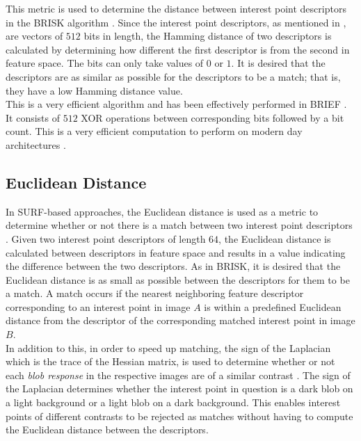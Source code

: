 This metric is used to determine the distance between interest point descriptors in the BRISK algorithm \citep{Leutenegger2011}. Since the interest point descriptors, as mentioned in , are vectors of $512$ bits in length, the Hamming distance of two descriptors is calculated by determining how different the first descriptor is from the second in feature space. The bits can only take values of $0$ or $1$. It is desired that the descriptors are as similar as possible for the descriptors to be a match; that is, they have a low Hamming distance value. \\

This is a very efficient algorithm and has been effectively performed in BRIEF \citep{Calonder}. It consists of $512$ XOR operations between corresponding bits followed by a bit count. This is a very efficient computation to perform on modern day architectures \citep{Leutenegger2011}. \\ 

\subsection{Euclidean Distance}
\label{sec:euclidean}
In SURF-based approaches,  the Euclidean distance is used as a metric to determine whether or not there is a match between two interest point descriptors \citep{Lowe2004}. Given two interest point descriptors of length $64$, the Euclidean distance is calculated between descriptors in feature space and results in a value indicating the difference between the two descriptors. As in BRISK, it is desired that the Euclidean distance is as small as possible between the descriptors for them to be a match. A match occurs if the nearest neighboring feature descriptor corresponding to an interest point in image $A$ is within a predefined Euclidean distance from the descriptor of the corresponding matched interest point in image $B$.\\

In addition to this, in order to speed up matching, the sign of the Laplacian which is the trace of the Hessian matrix, is used to determine whether or not each \textit{blob response} in the respective images are of a similar contrast \citep{Bay2008}. The sign of the Laplacian determines whether the interest point in question is a dark blob on a light background or a light blob on a dark background. This enables interest points of different contrasts to be rejected as matches without having to compute the Euclidean distance between the descriptors.\\

